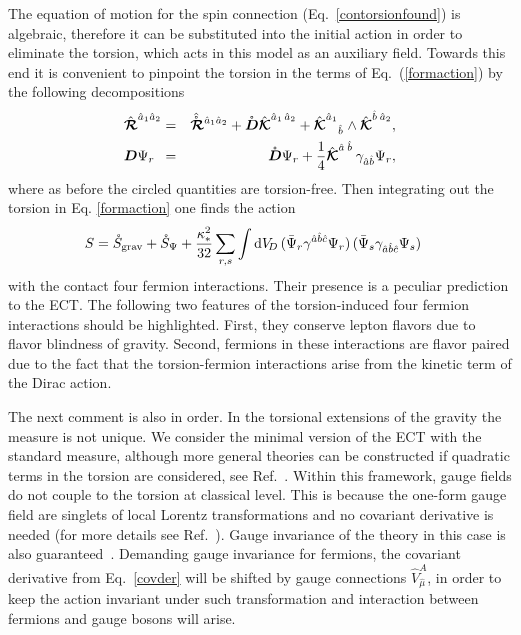 \documentclass[twocolumn,showpacs,showkeys,prd,superscriptaddress]{revtex4-1}
\begin{document}
The equation of motion for the spin connection (Eq.~\eqref{contorsionfound}) is algebraic, therefore it can be substituted into the initial action in order to eliminate the torsion, which acts in this model as an auxiliary field. Towards this end it is convenient to pinpoint the torsion in the terms of Eq.~(\ref{formaction}) by the following decompositions
\begin{eqnarray}
  \label{gravdecomp}
  \Rfhn{a}{1}{a}{2} &=& \Rfhnfree{a}{1}{a}{2} + \free{\Df}\Kfhn{a}{1}{a}{2} + \Kfhnud{a}{1}{b}{}\wedge\Kfhn{b}{}{a}{2},\\
  \label{F-decomp}
  \Df\Psi_r \ \, &=& \free{\Df}\Psi_r + \frac{1}{4}\Kfhn{a}{}{b}{}\,\gamma_{\hat{a}\hat{b}}\Psi_r,
\end{eqnarray}
where as before the circled quantities are torsion-free. Then integrating out the torsion in Eq. \eqref{formaction} one finds the action
\begin{align}\label{4FI}
  S &= \free{S}_\text{grav} + \free{S}_\Psi + \frac{\kappa_* ^2}{32}\sum_{r,s}\int \dv[D]\,(\bar{\Psi}_r\gamma^{\hat{a}\hat{b}\hat{c}}\Psi_r)\,(\bar{\Psi}_s\gamma_{\hat{a}\hat{b}\hat{c}}\Psi_s)
\end{align}
with the contact four fermion interactions. Their presence is a peculiar prediction to the ECT. The following two features of the torsion-induced four fermion interactions should be highlighted. First, they conserve lepton flavors due to flavor blindness of gravity. Second, fermions in these interactions are flavor paired due to the fact that the torsion-fermion interactions arise from the kinetic term of  the Dirac action. 

The next comment is also in order. In the torsional extensions of the gravity the measure is not unique.
We consider the minimal version of the ECT with the standard measure, although more general theories can be constructed if quadratic terms in the torsion are considered, see Ref.~\cite{PhysRevD.18.2730,PhysRevD.22.1915,Baekler2011,Fabbri:2011kq}. Within this framework, gauge fields do not couple to the torsion at classical level. 
This is because the one-form gauge field are singlets of local Lorentz transformations and no covariant derivative is needed (for more details see Ref.~\cite{Benn:1980ea}). Gauge invariance of the theory in this case is also guaranteed~\cite{Hehl:1976kj}. 
Demanding gauge invariance for fermions, the covariant derivative from Eq.~\eqref{covder} will be shifted by gauge connections $\hat{V}_{\hat{\mu}}^A$, in order to keep the action invariant under such transformation and interaction between fermions and gauge bosons will arise.
\end{document}
